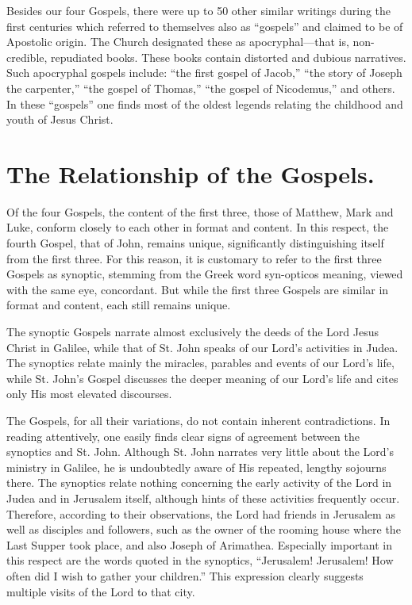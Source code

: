 Besides our four Gospels, there were up to 50 other similar writings during the first centuries which referred to themselves also as ``gospels'' and claimed to be of Apostolic origin. The Church designated these as apocryphal---that is, non-credible, repudiated books. These books contain distorted and dubious narratives. Such apocryphal gospels include: ``the first gospel of Jacob,'' ``the story of Joseph the carpenter,'' ``the gospel of Thomas,'' ``the gospel of Nicodemus,'' and others. In these ``gospels'' one finds most of the oldest legends relating the childhood and youth of Jesus Christ.

\section{The Relationship of the Gospels.}

Of the four Gospels, the content of the first three, those of Matthew, Mark and Luke, conform closely to each other in format and content. In this respect, the fourth Gospel, that of John, remains unique, significantly distinguishing itself from the first three. For this reason, it is customary to refer to the first three Gospels as synoptic, stemming from the Greek word syn-opticos meaning, viewed with the same eye, concordant. But while the first three Gospels are similar in format and content, each still remains unique.

The synoptic Gospels narrate almost exclusively the deeds of the Lord Jesus Christ in Galilee, while that of St. John speaks of our Lord's activities in Judea. The synoptics relate mainly the miracles, parables and events of our Lord's life, while St. John's Gospel discusses the deeper meaning of our Lord's life and cites only His most elevated discourses.

The Gospels, for all their variations, do not contain inherent contradictions. In reading attentively, one easily finds clear signs of agreement between the synoptics and St. John. Although St. John narrates very little about the Lord's ministry in Galilee, he is undoubtedly aware of His repeated, lengthy sojourns there. The synoptics relate nothing concerning the early activity of the Lord in Judea and in Jerusalem itself, although hints of these activities frequently occur. Therefore, according to their observations, the Lord had friends in Jerusalem as well as disciples and followers, such as the owner of the rooming house where the Last Supper took place, and also Joseph of Arimathea. Especially important in this respect are the words quoted in the synoptics, ``Jerusalem! Jerusalem! How often did I wish to gather your children.'' This expression clearly suggests multiple visits of the Lord to that city.

